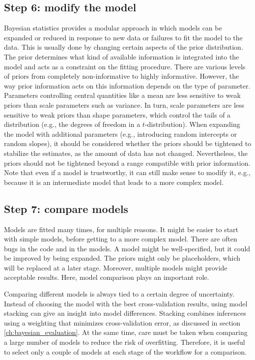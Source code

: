 \subsection{Step 6: modify the model}

Bayesian statistics provides a modular approach in which models can be expanded or reduced in response to new data or failures to fit the model to the data.
This is usually done by changing certain aspects of the prior distribution.
The prior determines what kind of available information is integrated into the model and acts as a constraint on the fitting procedure.
There are various levels of priors from completely non-informative to highly informative.
However, the way prior information acts on this information depends on the type of parameter.
Parameters controlling central quantities like a mean are less sensitive to weak priors than scale parameters such as variance.
In turn, scale parameters are less sensitive to weak priors than shape parameters, which control the tails of a distribution (e.g., the degrees of freedom in a $t$-distribution).
When expanding the model with additional parameters (e.g., introducing random intercepts or random slopes), it should be considered whether the priors should be tightened to stabilize the estimates, as the amount of data has not changed.
Nevertheless, the priors should not be tightened beyond a range compatible with prior information.
Note that even if a model is trustworthy, it can still make sense to modify it, e.g., because it is an intermediate model that leads to a more complex model.

\subsection{Step 7: compare models}

Models are fitted many times, for multiple reasons.
It might be easier to start with simple models, before getting to a more complex model. There are often bugs in the code and in the models.
A model might be well-specified, but it could be improved by being expanded.
The priors might only be placeholders, which will be replaced at a later stage.
Moreover, multiple models might provide acceptable results.
Here, model comparison plays an important role.

Comparing different models is always tied to a certain degree of uncertainty.
Instead of choosing the model with the best cross-validation results, using model stacking can give an insight into model differences.
Stacking combines inferences using a weighting that minimizes cross-validation error, as discussed in section \ref{ch:bayesian_evaluation}.
At the same time, care must be taken when comparing a large number of models to reduce the risk of overfitting.
Therefore, it is useful to select only a couple of models at each stage of the workflow for a comparison.
